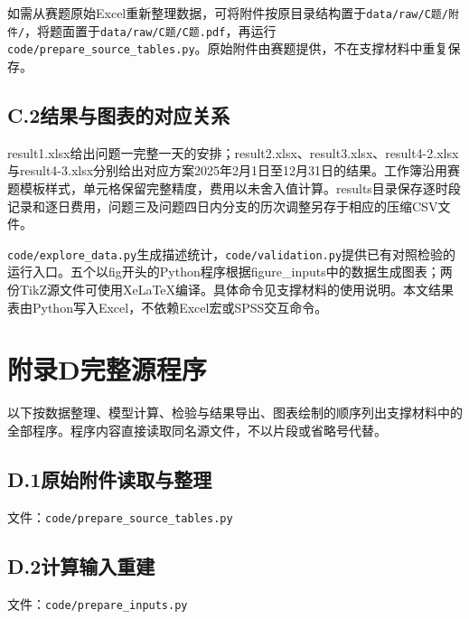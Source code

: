 如需从赛题原始Excel重新整理数据，可将附件按原目录结构置于\texttt{data/\allowbreak{}raw/\allowbreak{}C题/\allowbreak{}附件/\allowbreak{}}，将题面置于\texttt{data/\allowbreak{}raw/\allowbreak{}C题/\allowbreak{}C题.pdf}，再运行\texttt{code/\allowbreak{}prepare\_\allowbreak{}source\_\allowbreak{}tables.py}。原始附件由赛题提供，不在支撑材料中重复保存。

\subsection*{C.2\quad 结果与图表的对应关系}
result1.xlsx给出问题一完整一天的安排；result2.xlsx、result3.xlsx、result4-2.xlsx与result4-3.xlsx分别给出对应方案2025年2月1日至12月31日的结果。工作簿沿用赛题模板样式，单元格保留完整精度，费用以未舍入值计算。results目录保存逐时段记录和逐日费用，问题三及问题四日内分支的历次调整另存于相应的压缩CSV文件。

\texttt{code/\allowbreak{}explore\_\allowbreak{}data.py}生成描述统计，\texttt{code/\allowbreak{}validation.py}提供已有对照检验的运行入口。五个以fig开头的Python程序根据figure\_inputs中的数据生成图表；两份TikZ源文件可使用XeLaTeX编译。具体命令见支撑材料的使用说明。本文结果表由Python写入Excel，不依赖Excel宏或SPSS交互命令。

\clearpage
\section*{附录D\quad 完整源程序}
以下按数据整理、模型计算、检验与结果导出、图表绘制的顺序列出支撑材料中的全部程序。程序内容直接读取同名源文件，不以片段或省略号代替。
\begingroup
{}

\par\ifdim\dimexpr\pagegoal-\pagetotal\relax<8\baselineskip\newpage\fi
\subsection*{D.1\quad 原始附件读取与整理}
\noindent 文件：\texttt{code/\allowbreak{}prepare\_\allowbreak{}source\_\allowbreak{}tables.py}\par
\smallskip
{}

\par\ifdim\dimexpr\pagegoal-\pagetotal\relax<8\baselineskip\newpage\fi
\subsection*{D.2\quad 计算输入重建}
\noindent 文件：\texttt{code/\allowbreak{}prepare\_\allowbreak{}inputs.py}\par
\smallskip
{}

